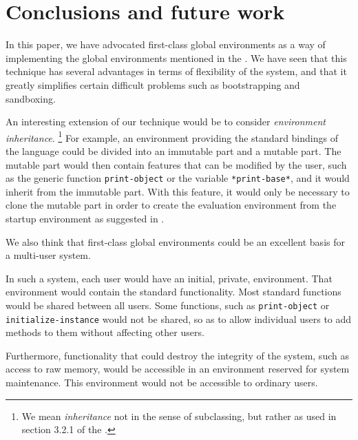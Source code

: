 \section{Conclusions and future work}

In this paper, we have advocated first-class global environments as a
way of implementing the global environments mentioned in the \hs{}.
We have seen that this technique has several advantages in terms of
flexibility of the system, and that it greatly simplifies certain
difficult problems such as bootstrapping and sandboxing.

An interesting extension of our technique would be to consider
\emph{environment inheritance}.%
\footnote{We mean \emph{inheritance} not in the sense of subclassing,
  but rather as used in section 3.2.1 of the \hs{}.}
For example, an environment providing the standard bindings of the
\commonlisp{} language could be divided into an immutable part and a
mutable part.  The mutable part would then contain features that can
be modified by the user, such as the generic function
\texttt{print-object} or the variable \texttt{*print-base*}, and it
would inherit from the immutable part.  With this feature, it would
only be necessary to clone the mutable part in order to create the
evaluation environment from the startup environment as suggested in
.

We also think that first-class global environments could be an
excellent basis for a multi-user \commonlisp{} system.

In such a system, each user would have an initial, private,
environment.  That environment would contain the standard
\commonlisp{} functionality.  Most standard \commonlisp{} functions
would be shared between all users.  Some functions, such as
\texttt{print-object} or \texttt{initialize-instance} would not be
shared, so as to allow individual users to add methods to them without
affecting other users.

Furthermore, functionality that could destroy the integrity of the
system, such as access to raw memory, would be accessible in an
environment reserved for system maintenance.  This environment would
not be accessible to ordinary users.
